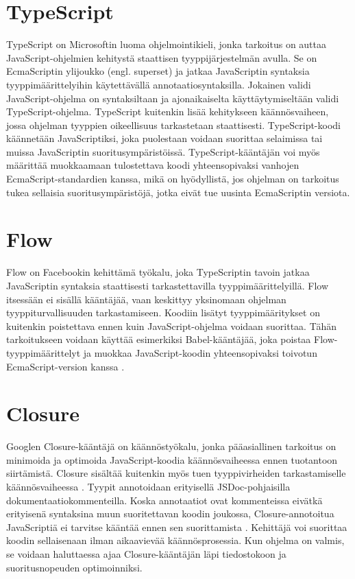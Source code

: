 \section{TypeScript}
TypeScript on Microsoftin luoma ohjelmointikieli, jonka tarkoitus on
auttaa JavaScript-ohjelmien kehitystä staattisen tyyppijärjestelmän avulla.
Se on EcmaScriptin ylijoukko (engl. superset) \cite{TypeScriptSpec} ja jatkaa
JavaScriptin syntaksia tyyppimäärittelyihin käytettävällä
annotaatiosyntaksilla. Jokainen validi JavaScript-ohjelma on syntaksiltaan ja
ajonaikaiselta käyttäytymiseltään validi TypeScript-ohjelma. TypeScript
kuitenkin lisää kehitykseen käännösvaiheen, jossa ohjelman tyyppien
oikeellisuus tarkastetaan staattisesti. TypeScript-koodi käännetään
JavaScriptiksi, joka puolestaan voidaan suorittaa selaimissa tai muissa
JavaScriptin suoritusympäristöissä. TypeScript-kääntäjän voi myös määrittää
muokkaamaan tulostettava koodi yhteensopivaksi vanhojen
EcmaScript-standardien kanssa, mikä on hyödyllistä, jos ohjelman on tarkoitus
tukea sellaisia suoritusympäristöjä, jotka eivät tue uusinta EcmaScriptin
versiota.

\section{Flow}
Flow on Facebookin kehittämä työkalu, joka TypeScriptin tavoin jatkaa
JavaScriptin syntaksia staattisesti tarkastettavilla tyyppimäärittelyillä.
Flow itsessään ei sisällä kääntäjää, vaan keskittyy yksinomaan ohjelman
tyyppiturvallisuuden tarkastamiseen. Koodiin lisätyt tyyppimääritykset on
kuitenkin poistettava ennen kuin JavaScript-ohjelma voidaan suorittaa. Tähän
tarkoitukseen voidaan käyttää esimerkiksi Babel-kääntäjää, joka poistaa
Flow-tyyppimäärittelyt ja muokkaa JavaScript-koodin yhteensopivaksi toivotun
EcmaScript-version kanssa \cite{FlowInstallation}.

\section{Closure}
Googlen Closure-kääntäjä on käännöstyökalu, jonka pääasiallinen tarkoitus
on minimoida ja optimoida JavaScript-koodia käännösvaiheessa ennen tuotantoon
siirtämistä. Closure sisältää kuitenkin myös tuen tyyppivirheiden
tarkastamiselle käännösvaiheessa \cite{ClosureCompiler}. Tyypit annotoidaan
erityisellä JSDoc-pohjaisilla dokumentaatiokommenteilla. Koska annotaatiot
ovat kommenteissa eivätkä erityisenä syntaksina muun suoritettavan koodin
joukossa, Closure-annotoitua JavaScriptiä ei tarvitse kääntää ennen sen
suorittamista \cite{annotatingJSforClosure}. Kehittäjä voi suorittaa koodin
sellaisenaan ilman aikaavievää käännösprosessia. Kun ohjelma on valmis,
se voidaan haluttaessa ajaa Closure-kääntäjän läpi tiedostokoon
ja suoritusnopeuden optimoinniksi.
